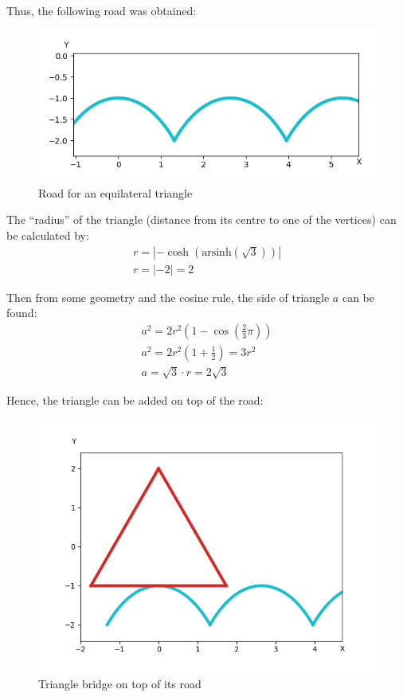 \documentclass[12pt]{article}
\begin{document}
        Thus, the following road was obtained:
        \begin{figure}[H]
            \centering
            \includegraphics[width=0.9\linewidth]{images/triangle_road.png}
            \caption{Road for an equilateral triangle}
        \end{figure}

        The ``radius'' of the triangle (distance from its centre to one of the vertices) can be calculated by:
        \begin{align}
            r = | -\cosh( \text{arsinh}(\sqrt{3}) ) | \\
            r = | -2 | = 2
        \end{align}

        Then from some geometry and the cosine rule, the side of triangle $a$ can be found:
        \begin{align}
            a^2 = 2r^2 (1 - \cos(\frac{2}{3}\pi)) \\
            a^2 = 2r^2 (1 + \frac{1}{2}) = 3r^2 \\
            a = \sqrt{3} \cdot r = 2\sqrt{3}
        \end{align}

        Hence, the triangle can be added on top of the road:
        \begin{figure}[H]
            \centering
            \includegraphics[width=0.8\linewidth]{images/tirangle_road_with.png}
            \caption{Triangle bridge on top of its road}
        \end{figure}
\end{document}
